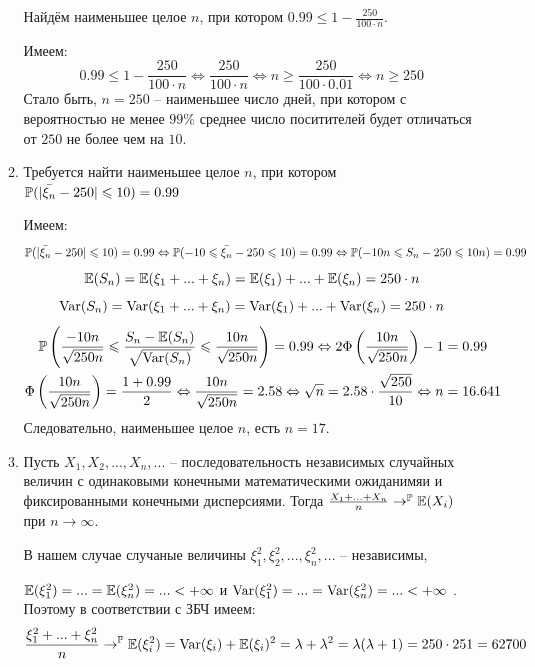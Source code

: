 \documentclass[12pt, a4paper]{article}\usepackage[]{graphicx}\usepackage[]{color}
\begin{document}
\begin{enumerate}
\begin{enumerate}
								Найдём наименьшее целое $n$, при котором $0.99 \leq 1 - \frac{250}{100\cdot n}$.
								
								Имеем:
								\[
								0.99 \leq 1 - \frac{250}{100\cdot n} \Leftrightarrow \frac{250}{100\cdot n} \Leftrightarrow n \geq \frac{250}{100 \cdot 0.01} \Leftrightarrow n  \geq 250
								\]
								Стало быть, $n=250$ – наименьшее число дней, при котором с вероятностью не менее $99\%$ среднее число поситителей будет отличаться от $250$ не более чем на $10$.
								\item  Требуется найти наименьшее целое $n$, при котором $\P(\vert\bar{\xi_n}-250\vert \leq 10)=0.99$
								
								Имеем:
								\[
								\P(\vert\bar{\xi_n}-250\vert \leq 10)=0.99 \Leftrightarrow \P(-10\leq \bar{\xi_n} -250 \leq 10) =0.99 \Leftrightarrow \P(-10n \leq S_n-250 \leq 10n) =0.99 
								\]
								\[
								\E(S_n) = \E(\xi_1 + ... + \xi_n) = \E(\xi_1) + ... + \E(\xi_n) = 250\cdot n
								\]
								\[
								\Var(S_n) = \Var(\xi_1 + ... + \xi_n) = \Var(\xi_1) + ... + \Var(\xi_n) = 250 \cdot n 
								\]
								\begin{multline*}
								\P\left(\frac{-10n}{\sqrt{250n}} \leq \frac{S_n - \E (S_n)}{\sqrt{\Var(S_n)}} \leq \frac{10n}{\sqrt{250n}}\right) =0.99 \Leftrightarrow 2 \Phi \left(\frac{10n}{\sqrt{250n}}\right) -1 = 0.99 \\
								\Phi \left(\frac{10n}{\sqrt{250n}}\right) = \frac{1 + 0.99}{2} \Leftrightarrow \frac{10n}{\sqrt{250n}} = 2.58 \Leftrightarrow \sqrt{n} = 2.58 \cdot \frac{\sqrt{250}}{10} \Leftrightarrow n = 16.641
								\end{multline*}
								Следовательно, наименьшее целое $n$, есть $n=17$.
								\item Пусть $X_1, X_2, ..., X_n, ...$ – последовательность независимых случайных величин с одинаковыми конечными математическими ожиданимяи и фиксированными конечными дисперсиями. Тогда $\frac{X_1 + ... + X_n}{n} \to^{\P} \E(X_i)$ при $n \to \infty$.
								
								В нашем случае случаные величины $\xi_1^2, \xi_2^2, ..., \xi_n^2, ...$ – независимы,
								
								 $\E(\xi_1^2) = ... = \E(\xi_n^2) = ... < + \infty$ и $\Var(\xi_1^2) = ... = \Var(\xi_n^2) = ... < + \infty$ . Поэтому в соответствии с ЗБЧ имеем:
								\[
								\frac{\xi_1^2 +...+ \xi_n^2}{n} \to^{\P} \E(\xi_i^2) = \Var(\xi_i) +\E(\xi_i)^2 = \lambda + \lambda^2 = \lambda(\lambda+1) = 250\cdot251 = 62700
								\] 								
							\end{enumerate}
				

\end{enumerate}
\end{document}
